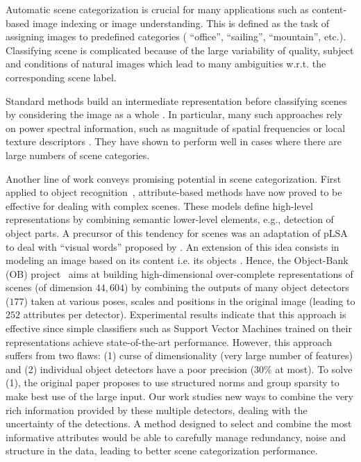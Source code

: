 \documentclass[runningheads,a4paper]{llncs}
\begin{document}
Automatic scene categorization is crucial for many applications such
as content-based image indexing \cite{Smeulders:2000} or image
understanding.
%
This is defined as the task of assigning images to predefined
categories ( ``office'', ``sailing'', ``mountain'', etc.).
%
Classifying scene is complicated because of the large variability of
quality, subject and conditions of natural images which lead to many
ambiguities w.r.t. the corresponding scene label.

Standard methods build an intermediate representation before
classifying scenes by considering the image as a whole
\cite{Torralba03,Vogel:2004,FeiFei:2005,Oliva06}. In particular, many
such approaches rely on power spectral information, such as
magnitude of spatial frequencies \cite{Oliva06} or local texture
descriptors \cite{FeiFei:2005}.
%
They have shown to perform well in cases where there are large
numbers of scene categories.

Another line of work conveys promising potential in scene categorization.
%
First applied to object recognition~\cite{Farhadi:2009}, attribute-based
methods have now proved to be effective for dealing with complex scenes.
%
These models define high-level representations by combining semantic
lower-level elements, e.g., detection of object parts.
%
A precursor of this tendency for scenes was an adaptation of
pLSA~\cite{Hofmann:2001} to deal with ``visual words'' proposed by
\cite{Bosh:2006}. 
%
An extension of this idea consists in modeling an image based on its content
i.e. its objects \cite{Espinace10ICRA,LiJiaLi10}. Hence, the Object-Bank (OB)
project~\cite{LiSuLimFeiFei} aims at building high-dimensional over-complete
representations of scenes (of dimension $44,604$) by combining the outputs of
many object detectors ($177$) taken at various poses, scales and positions in
the original image (leading to $252$ attributes per detector).
%
Experimental results indicate that this approach is effective since simple
classifiers such as Support Vector Machines trained on their representations
achieve state-of-the-art performance.
%
However, this approach suffers from two flaws: (1) curse of dimensionality
(very large number of features) and (2) individual object detectors have a poor
precision (30\% at most).
%
%
To solve (1), the original paper proposes to use structured norms and group
sparsity to make best use of the large input.
%
%
Our work studies new ways to combine the very rich information provided by
these multiple detectors, dealing with the uncertainty of the detections.
%
A method designed to select and combine the most informative attributes would
be able to carefully manage redundancy, noise and structure in the data,
leading to better scene categorization performance.
\end{document}
